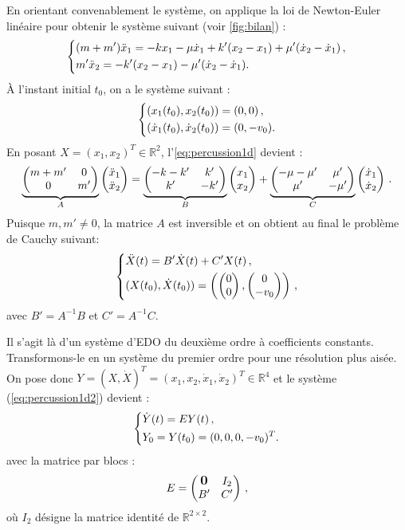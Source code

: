 \noindent En orientant convenablement le système, on applique la loi de Newton-Euler linéaire
pour obtenir le système suivant (voir \cref{fig:bilan}) :
\begin{align}
    \begin{dcases}
    (m+m')\ddot x_1 = -kx_1 - \mu \dot x_1 + k'(x_2 - x_1) + \mu'(\dot x_2 - \dot x_1) \,, \\
        m' \ddot x_2 =  -k'(x_2 - x_1) - \mu'(\dot x_2 - \dot x_1) .
    \end{dcases}
\end{align}
À l'instant initial $t_0$, on a le système suivant :
\begin{align} \label{eq:percussion1d}
    \begin{dcases}
    (x_1(t_0), x_2(t_0)) = (0,0) \,, \\
    (\dot x_1(t_0), \dot x_2(t_0)) = (0,-v_0) .
    \end{dcases}
\end{align}
En posant $X = (x_1, x_2)^T \in \mathbb{R}^2$, l'\cref{eq:percussion1d} devient :
\begin{align}
    \underbrace{\begin{pmatrix} m+m' & 0 \\ 0 & m' \end{pmatrix}}_{A} \begin{pmatrix} \ddot{x}_1 \\ \ddot{x}_2 \end{pmatrix} = \underbrace{\begin{pmatrix} -k-k' & k' \\ k' & -k' \end{pmatrix}}_{B} \begin{pmatrix} x_1 \\ x_2 \end{pmatrix} + \underbrace{\begin{pmatrix} -\mu -\mu^\prime & \mu' \\ \mu' & -\mu' \end{pmatrix}}_{C} \begin{pmatrix} \dot{x}_1 \\ \dot{x}_2 \end{pmatrix} \,.
\end{align}
Puisque $m, m'\neq 0$, la matrice $A$ est inversible et on obtient au final le problème de Cauchy suivant:
\begin{align} \label{eq:percussion1d2}
    \begin{dcases}
        \ddot{X}(t) = B' \dot{X}(t) + C'X(t) \,, \\
        (X(t_0), \dot X (t_0)) = \left( \begin{pmatrix} 0 \\ 0 \end{pmatrix}, \begin{pmatrix} 0 \\ -v_0 \end{pmatrix} \right) \,,
    \end{dcases}
\end{align}
avec $B' = A^{-1}B$ et $C' = A^{-1}C$.

\noindent Il s'agit là d'un système d'EDO du deuxième ordre à coefficients constants. Transformons-le en un système du premier ordre pour
une résolution plus aisée. On pose donc $Y= (X, \dot X)^T = (x_1, x_2, \dot{x}_1, \dot{x}_2)^T \in \mathbb{R}^4$ et le
système
(\ref{eq:percussion1d2})
devient :
\begin{align} \label{eq:systeme1d}
    \begin{dcases}
        \dot{Y}(t)= E Y(t) \,, \\
        Y_0 = Y(t_0) = (0,0,0,-v_0)^T .
    \end{dcases}
\end{align}
avec la matrice par blocs : \[ E = \begin{pmatrix} \mbox{\normalfont\large\bfseries 0} & I_2 \\ B' & C' \end{pmatrix} \,, \] où $I_2$ désigne la matrice identité de
$\mathbb{R}^{2\times2}$.

